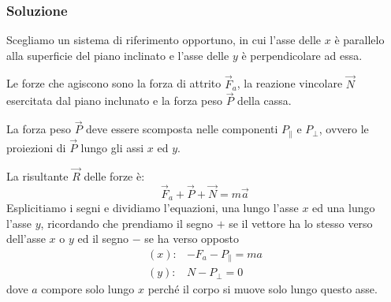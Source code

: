 \documentclass{report}
\begin{document}
\begin{enumerate}
\subsubsection{Soluzione}
\label{sec:sol16}

Scegliamo un sistema di riferimento opportuno, in cui l'asse delle $x$ è parallelo alla superficie del
piano inclinato e l'asse delle $y$ è perpendicolare ad essa.

Le forze che agiscono sono la forza di attrito $\vec{F}_a$, la reazione vincolare $\vec{N}$ esercitata
dal piano inclunato e la forza peso $\vec{P}$ della cassa.

La forza peso $\vec{P}$ deve essere scomposta nelle componenti $P_\parallel$ e $P_\bot$, ovvero le
proiezioni di $\vec{P}$ lungo gli assi $x$ ed $y$.

La risultante $\vec{R}$ delle forze è:
\begin{equation*}
  \vec{F}_a+\vec{P}+\vec{N}=m\vec{a}
\end{equation*}
Esplicitiamo i segni e dividiamo l'equazioni, una lungo l'asse $x$ ed una lungo l'asse $y$, ricordando
che prendiamo il segno $+$ se il vettore ha lo stesso verso dell'asse $x$ o $y$ ed il segno $-$ se ha
verso opposto
\begin{equation*}
  \begin{matrix}
    (x): & -F_a -P_\parallel=ma\\
    (y): & N-P_\bot =0
  \end{matrix}
\end{equation*}
dove $a$ compore solo lungo $x$ perché il corpo si muove solo lungo questo asse.


\end{enumerate}
\end{document}
